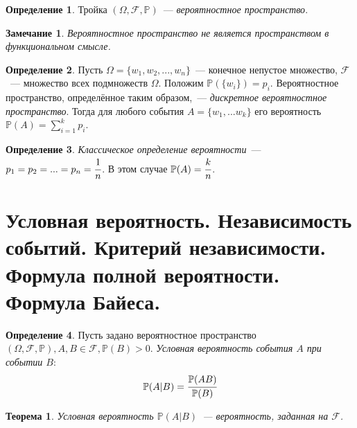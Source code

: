 \documentclass[oneside,final,14pt]{extreport}
\newcommand\myprob[1]{{\mathbb{P}(#1)}}
\newtheorem{thm}{Теорема}[section]
\newtheorem*{rmrk}{Замечание}
\theoremstyle{definition}
\newtheorem{defn}{Определение}[section]
\begin{document}
\begin{defn}
    Тройка \( (\Omega, \mathcal{F}, \mathbb{P}) \)~--- {\it вероятностное пространство}.
\end{defn}
\begin{rmrk}
    Вероятностное пространство не является пространством в функциональном смысле.
\end{rmrk}

\begin{defn}
    Пусть \( \Omega = \{ w_1, w_2,..., w_n\} \)~--- конечное непустое множество, \( \mathcal{F} \)~--- множество всех подмножеств \( \Omega \). Положим \( \myprob{\{w_i\}} = p_i \). Вероятностное пространство, определённое таким образом,~--- {\it дискретное вероятностное пространство}. Тогда для любого события \( A = \{ w_1,...w_k\} \) его вероятность \( \myprob{A} = \sum\limits_{i=1}^k p_i \).
\end{defn}

\begin{defn}
    {\it Классическое определение вероятности}~--- \(p_1 = p_2 =...=p_n=\cfrac{1}{n} \). В этом случае \( \myprob{A} = \cfrac{k}{n} \).
\end{defn}

\section {Условная вероятность. Независимость событий. Критерий независимости. Формула полной вероятности. Формула Байеса.}

\begin{defn}
    Пусть задано вероятностное пространство \( (\Omega, \mathcal{F}, \mathbb{P}), A, B \in \mathcal{F}, \myprob{B} > 0 \). {\it Условная вероятность события \( A \) при событии \(B\)}:
    \begin{equation*}
        \myprob{A|B}=\cfrac{\myprob{AB}}{\myprob{B}}
    \end{equation*}
\end{defn}

\begin{thm}
    Условная вероятность \( \myprob{A|B} \)~--- вероятность, заданная на \( \mathcal{F} \).
\end{thm}
\end{document}
